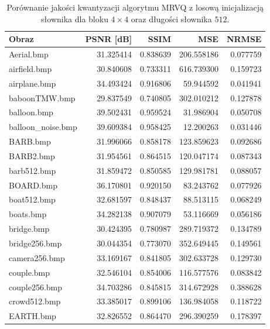 \documentclass{article}
\begin{document}
\begin{table}[H]
  \caption{Porównanie jakości kwantyzacji algorytmu MRVQ z losową inicjalizacją słownika dla bloku $4 \times 4$ oraz długości słownika $512$.}
  \label{tab:mrvq_random}
  \centering
  \begin{tabular}{@{}lrrrr@{}}

    \toprule
    Obraz              & PSNR [dB] & SSIM     & MSE        & NRMSE    \\
    \midrule
    Aerial.bmp         & 31.325414 & 0.838639 & 206.558186 & 0.077759 \\
    airfield.bmp       & 30.840608 & 0.733311 & 616.739300 & 0.159723 \\
    airplane.bmp       & 34.493424 & 0.916806 & 59.944592  & 0.041941 \\
    baboonTMW.bmp      & 29.837549 & 0.740805 & 302.010212 & 0.127878 \\
    balloon.bmp        & 39.502431 & 0.959524 & 31.986904  & 0.050708 \\
    balloon\_noise.bmp & 39.609384 & 0.958425 & 12.200263  & 0.031446 \\
    BARB.bmp           & 31.996066 & 0.858178 & 123.859623 & 0.092686 \\
    BARB2.bmp          & 31.954561 & 0.864515 & 120.047174 & 0.087343 \\
    barb512.bmp        & 31.859472 & 0.850585 & 129.981781 & 0.088057 \\
    BOARD.bmp          & 36.170801 & 0.920150 & 83.243762  & 0.077926 \\
    boat512.bmp        & 32.681597 & 0.848437 & 88.513115  & 0.068249 \\
    boats.bmp          & 34.282138 & 0.907079 & 53.116669  & 0.056186 \\
    bridge.bmp         & 30.424395 & 0.780987 & 289.719372 & 0.134789 \\
    bridge256.bmp      & 30.044354 & 0.773070 & 352.649445 & 0.149561 \\
    camera256.bmp      & 33.169167 & 0.841805 & 302.633728 & 0.129730 \\
    couple.bmp         & 32.546104 & 0.854006 & 116.577576 & 0.083842 \\
    couple256.bmp      & 34.703286 & 0.845815 & 314.672928 & 0.388628 \\
    crowd512.bmp       & 33.385017 & 0.899106 & 136.984058 & 0.118722 \\
    EARTH.bmp          & 32.826552 & 0.864470 & 296.390259 & 0.178397 \\

\end{tabular}
\end{table}
\end{document}
